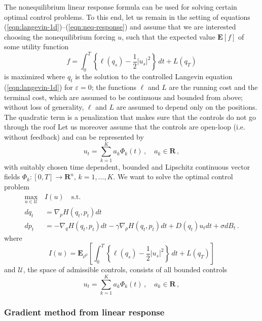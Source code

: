 \documentclass[]{tMPH2e}
\newcommand{\R}{{\mathbf R}}
\newcommand{\eps}{\varepsilon}
\newcommand{\cU}{\mathcal U}
\newcommand{\bE}{{\mathbf E}}
\begin{document}
The nonequilibrium linear response formula can be used for solving certain optimal control problems. To this end, let us remain in the setting of equations (\ref{eqn:langevin-1d})--(\ref{eqn:neq-response}) and assume that we are interested choosing the nonequilibrium forcing $u$, such that the expected value $\bE[f]$ of some utility function 
\[
f = \int_{0}^{T}\left\{\ell (q_{s}) - \frac{1}{2}|u_{s}|^{2}\right\}\,dt + L(q_{T}) 
\]
is maximized where $q_{t}$ is the solution to the controlled Langevin equation (\ref{eqn:langevin-1d}) for $\eps=0$; the functions $\ell$ and $L$ are the running cost and the terminal cost, which are assumed to be continuous and bounded from above; without loss of generality, $\ell$ and $L$ are assumed to depend only on the positions. The quadratic term is a penalization that makes sure that the controls do not go through the roof \cite{schuette2012,hartmann2012}  Let us moreover assume that the controls are open-loop (i.e. without feedback) and can be represented by 
\[
u_{t} = \sum_{k=1}^K a_k \Phi_k(t)\,,\quad a_{k}\in \R\,,
\]
with suitably chosen time dependent, bounded and Lipschitz continuous vector fields $\Phi_k\colon[0,T]\to\R^{n}$, $k=1,\ldots,K$. %
We want to solve the optimal control problem
\begin{equation}\label{ocp1}
\begin{aligned}
 \max_{u\in\cU} \,& I(u)\quad \textrm{s.t.}\\
dq_t & =  \nabla_p H(q_t,p_t)dt\\
dp_t & =  -\nabla_q H(q_t,p_t)dt - \gamma \nabla_p H(q_t,p_t)dt + D(q_t)u_{t} dt+\sigma dB_t\,.
\end{aligned}
\end{equation}
where 
\begin{equation}\label{ocp2}
I(u) = \bE_{\rho^0}\left[\int_{0}^{T}\left\{\ell (q_{s}) - \frac{1}{2}|u_{s}|^{2}\right\}\,dt + L(q_{T}) \right]
\end{equation}
and $\cU$, the space of admissible controls, consists of all bounded controls 
\begin{equation}\label{admissible}
u_{t} = \sum_{k=1}^K a_k \Phi_k(t)\,,\quad a_{k}\in \R\,,
\end{equation}


\subsubsection*{Gradient method from linear response}
\end{document}
